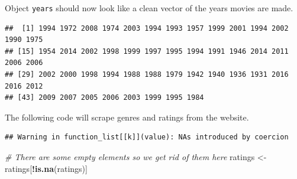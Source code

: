 \documentclass[]{book}
\newenvironment{Shaded}{\begin{snugshade}}{\end{snugshade}}
\newcommand{\CharTok}[1]{\textcolor[rgb]{0.31,0.60,0.02}{#1}}
\newcommand{\CommentTok}[1]{\textcolor[rgb]{0.56,0.35,0.01}{\textit{#1}}}
\newcommand{\DataTypeTok}[1]{\textcolor[rgb]{0.13,0.29,0.53}{#1}}
\newcommand{\KeywordTok}[1]{\textcolor[rgb]{0.13,0.29,0.53}{\textbf{#1}}}
\newcommand{\NormalTok}[1]{#1}
\newcommand{\OperatorTok}[1]{\textcolor[rgb]{0.81,0.36,0.00}{\textbf{#1}}}
\newcommand{\StringTok}[1]{\textcolor[rgb]{0.31,0.60,0.02}{#1}}
\begin{document}
Object \texttt{years} should now look like a clean vector of the years movies are made.

\begin{verbatim}
##  [1] 1994 1972 2008 1974 2003 1994 1993 1957 1999 2001 1994 2002 1990 1975
## [15] 1954 2014 2002 1998 1999 1997 1995 1994 1991 1946 2014 2011 2006 2006
## [29] 2002 2000 1998 1994 1988 1988 1979 1942 1940 1936 1931 2016 2016 2012
## [43] 2009 2007 2005 2006 2003 1999 1995 1984
\end{verbatim}

The following code will scrape genres and ratings from the website.

\begin{Shaded}
\end{Shaded}

\begin{verbatim}
## Warning in function_list[[k]](value): NAs introduced by coercion
\end{verbatim}

\begin{Shaded}
\begin{Highlighting}[]
\CommentTok{# There are some empty elements so we get rid of them here}
\NormalTok{ratings <-}\StringTok{ }\NormalTok{ratings[}\OperatorTok{!}\KeywordTok{is.na}\NormalTok{(ratings)]}
\end{Highlighting}
\end{Shaded}
\end{document}
